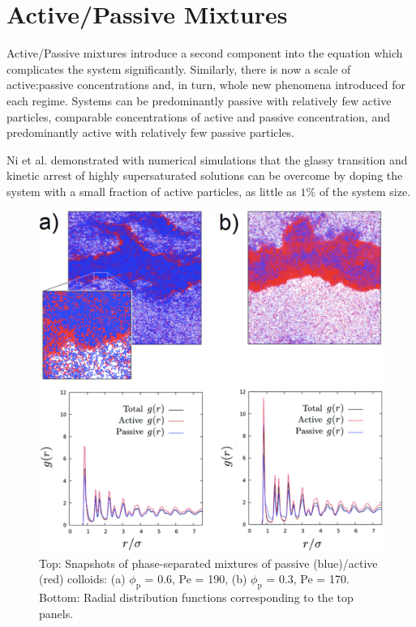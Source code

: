\documentclass[11pt]{article}
\begin{document}
\section{Active/Passive Mixtures}\label{activepassiveABPactivity}

Active/Passive mixtures introduce a second component into the equation which complicates the system significantly.  Similarly, there is now a scale of active:passive concentrations and, in turn, whole new phenomena introduced for each regime.  Systems can be predominantly passive with relatively few active particles, comparable concentrations of active and passive concentration, and predominantly active with relatively few passive particles.  

Ni et al.\cite{Ni,Ni2} demonstrated with numerical simulations that the glassy transition and kinetic arrest of highly supersaturated solutions can be overcome by doping the system with a small fraction of active particles, as little as $1\%$  of the system size.  

\begin{figure}[ht]
\centering\includegraphics[width=0.8\linewidth]{Screen Shot 2020-08-10 at 9.55.19 AM.png}
\caption{Top: Snapshots of phase-separated mixtures of
passive (blue)/active (red) colloids: (a) $\phi_\text{p}$ = 0.6, Pe = 190,
(b) $\phi_\text{p}$ = 0.3, Pe = 170. Bottom: Radial distribution functions
corresponding to the top panels. \cite{Rodriguez} }
\label{fig:RDF}
\end{figure}
\end{document}
